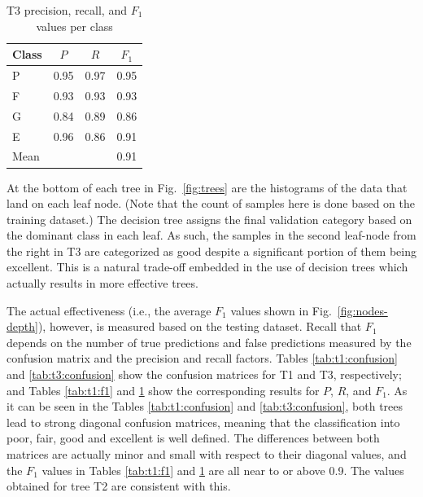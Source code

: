 \begin{table}[t]
	\centering
	\caption{T3 precision, recall, and $F_1$ values per class}
	\label{tab:t3:f1}
	\small
	\begin{tabular}{lccc}
	Class   & $P$	& $R$  	& $F_1$ \\ 
	\hline
	P 		& 0.95 	& 0.97 	& 0.95 	\\
	F 		& 0.93 	& 0.93 	& 0.93 	\\
	G 		& 0.84 	& 0.89 	& 0.86 	\\
	E 		& 0.96 	& 0.86 	& 0.91 	\\
	\hline
	Mean 	&		&		& 0.91	\\
	\end{tabular}
\end{table}

At the bottom of each tree in Fig.~\ref{fig:trees} are the histograms of the data that land on each leaf node. (Note that the count of samples here is done based on the training dataset.) The decision tree assigns the final validation category based on the dominant class in each leaf. As such, the samples in the second leaf-node from the right in T3 are categorized as good despite a significant portion of them being excellent. This is a natural trade-off embedded in the use of  decision trees which actually results in more effective trees. 

The actual effectiveness (i.e., the average $F_1$ values shown in Fig.~\ref{fig:nodes-depth}), however, is measured based on the testing dataset. Recall that $F_1$ depends on the number of true predictions and false predictions measured by the confusion matrix and the precision and recall factors. Tables \ref{tab:t1:confusion} and \ref{tab:t3:confusion} show the confusion matrices for T1 and T3, respectively; and Tables \ref{tab:t1:f1} and \ref{tab:t3:f1} show the corresponding results for $P$, $R$, and $F_1$. As it can be seen in the Tables \ref{tab:t1:confusion} and \ref{tab:t3:confusion}, both trees lead to strong diagonal confusion matrices, meaning that the classification into poor, fair, good and excellent is well defined. The differences between both matrices are actually minor and small with respect to their diagonal values, and the $F_1$ values in Tables \ref{tab:t1:f1} and \ref{tab:t3:f1} are all near to or above 0.9. The values obtained for tree T2 are consistent with this.

